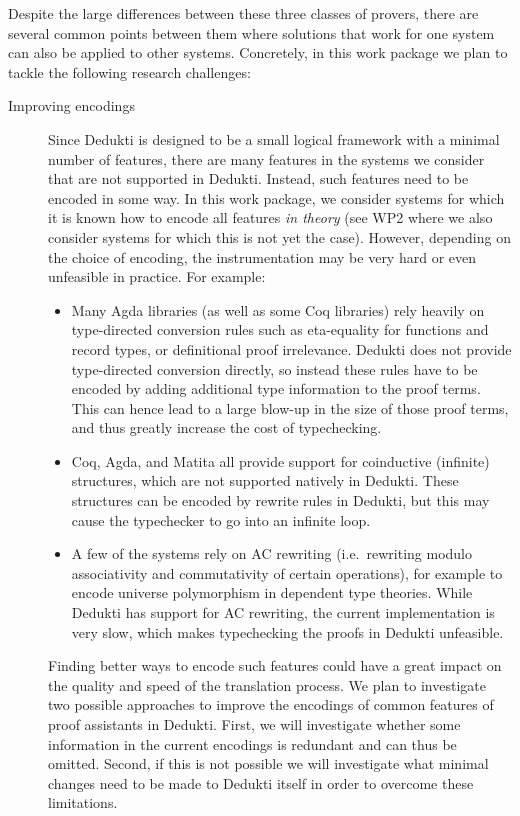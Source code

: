 \begin{description}
\end{description}
Despite the large differences between these three classes of provers,
there are several common points between them where solutions that work
for one system can also be applied to other systems.
%
Concretely, in this work package we plan to tackle the following
research challenges:
\begin{description}

  \item[Improving encodings] Since Dedukti is designed to be a small
  logical framework with a minimal number of features, there are many
  features in the systems we consider that are not supported in
  Dedukti. Instead, such features need to be encoded in some way. In
  this work package, we consider systems for which it is known how to
  encode all features \emph{in theory} (see WP2 where we also consider
  systems for which this is not yet the case). However, depending on
  the choice of encoding, the instrumentation may be very hard or even
  unfeasible in practice. For example:
  \begin{itemize}

    \item Many Agda libraries (as well as some Coq libraries) rely
    heavily on type-directed conversion rules such as eta-equality for
    functions and record types, or definitional proof
    irrelevance. Dedukti does not provide type-directed conversion
    directly, so instead these rules have to be encoded by adding
    additional type information to the proof terms. This can hence
    lead to a large blow-up in the size of those proof terms, and thus
    greatly increase the cost of typechecking.

    \item Coq, Agda, and Matita all provide support for coinductive
    (infinite) structures, which are not supported natively in
    Dedukti. These structures can be encoded by rewrite rules in
    Dedukti, but this may cause the typechecker to go into an infinite
    loop.

    \item A few of the systems rely on AC rewriting (i.e.~rewriting
    modulo associativity and commutativity of certain operations), for
    example to encode universe polymorphism in dependent type
    theories. While Dedukti has support for AC rewriting, the current
    implementation is very slow, which makes typechecking the proofs
    in Dedukti unfeasible.

  \end{itemize}
  Finding better ways to encode such features could have a great
  impact on the quality and speed of the translation process.  We plan
  to investigate two possible approaches to improve the encodings of
  common features of proof assistants in Dedukti. First, we will
  investigate whether some information in the current encodings is
  redundant and can thus be omitted. Second, if this is not possible
  we will investigate what minimal changes need to be made to Dedukti
  itself in order to overcome these limitations.


\end{description}
